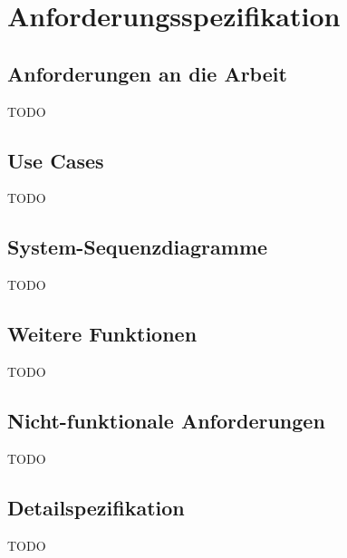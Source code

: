 
\section{Anforderungsspezifikation}
\label{sec:Anforderungsspezifikation}


\subsection{Anforderungen an die Arbeit}
\label{sub:Anforderungen an die Arbeit}

TODO

\subsection{Use Cases}
\label{sub:Use Cases}

TODO

\subsection{System-Sequenzdiagramme}
\label{sub:System-Sequenzdiagramme}

TODO

\subsection{Weitere Funktionen}
\label{sub:Weitere Funktionen}

TODO

\subsection{Nicht-funktionale Anforderungen}
\label{sub:Nicht-funktionale Anforderungen}

TODO

\subsection{Detailspezifikation}
\label{sub:Detailspezifikation}

TODO